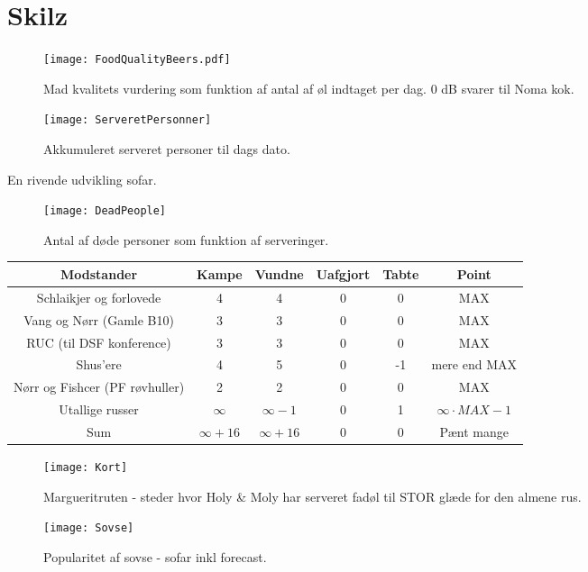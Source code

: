 \section*{Skilz}
\begin{figure}
\centering
\texttt{[image: FoodQualityBeers.pdf]}
\caption{Mad kvalitets vurdering som funktion af antal af øl indtaget per dag. 0 dB svarer til Noma kok.}
\label{fig:FoodBeer}
\end{figure}


\begin{figure}
\centering
\texttt{[image: ServeretPersonner]}
\caption{Akkumuleret serveret personer til dags dato.}
\label{fig:ServeretPersonner}
\end{figure}

En rivende udvikling sofar.

\begin{figure}
\centering
\texttt{[image: DeadPeople]}
\caption{Antal af døde personer som funktion af serveringer.}
\label{fig:DeadPeople}
\end{figure}

\begin{table}
\centering
\begin{tabular}{|c|c|c|c|c|c|} \hline 
Modstander & Kampe & Vundne & Uafgjort & Tabte & Point \\ \hline \hline
Schlaikjer og forlovede & 4 & 4 & 0 & 0 & MAX \\ \hline
Vang og Nørr (Gamle B10) & 3 & 3 & 0 & 0 & MAX \\ \hline
RUC (til DSF konference) & 3 & 3 & 0 & 0 & MAX \\ \hline
Shus'ere & 4 & 5 & 0 & -1 & mere end MAX \\ \hline
Nørr og Fishcer (PF røvhuller) & 2 & 2 & 0 & 0 & MAX \\ \hline
Utallige russer & $\infty $ & $\infty - 1 $ & 0 & 1 & $\infty \cdot MAX -1$ \\ \hline \hline
Sum & $\infty + 16 $ & $\infty + 16$ & 0 & 0 & Pænt mange \\ \hline

\end{tabular}
\end{table}

\begin{figure}
\centering
\texttt{[image: Kort]}
\caption{Margueritruten - steder hvor Holy \& Moly har serveret fadøl til STOR glæde for den almene rus.}
\label{fig:Kort}
\end{figure}

\begin{figure}
\centering
\texttt{[image: Sovse]}
\caption{Popularitet af sovse - sofar inkl forecast.}
\label{fig:Sovse}
\end{figure}



